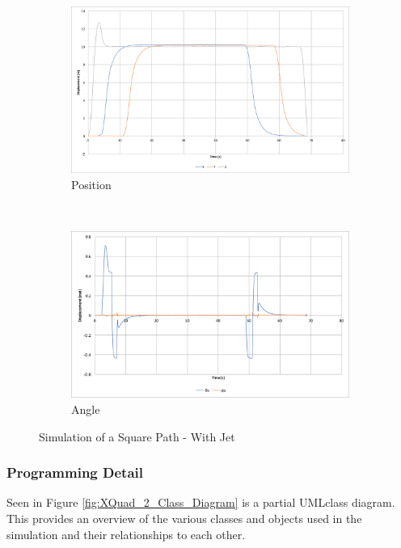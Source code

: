 \documentclass[11pt,twoside]{article}
\begin{document}
\begin{figure}
    \begin{subfigure}{\textwidth}
        \includegraphics[width=\linewidth]{square_path_w_jet}
        \caption{Position}
        \label{fig:square_path_w_jet}
    \end{subfigure}\hspace*{\fill}
    \\
    \begin{subfigure}{\textwidth}
        \includegraphics[width=\linewidth]{square_path_w_jet_angle}
        \caption{Angle}
        \label{fig:square_path_w_jet_angle}
    \end{subfigure}

    \caption{Simulation of a Square Path - With Jet}
    \label{fig:Square Path Jet}
\end{figure}

\subsubsection{Programming Detail}
Seen in Figure \ref{fig:XQuad_2_Class_Diagram}
is a partial UML\footnotemark class diagram. This provides an overview of the various classes and objects used in the simulation and their relationships to each other.
\end{document}
